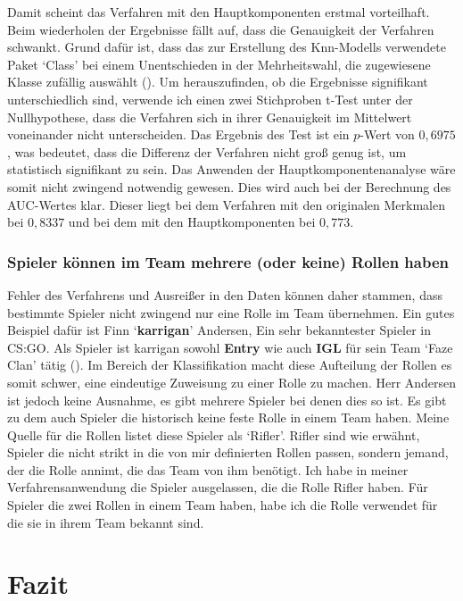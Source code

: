 \documentclass[envcountsame, envcountchap, deutsch]{i-studis}
\begin{document}
Damit scheint das Verfahren mit den Hauptkomponenten erstmal vorteilhaft.
Beim wiederholen der Ergebnisse fällt auf, dass die Genauigkeit der Verfahren schwankt. Grund dafür ist, dass das zur Erstellung des Knn-Modells verwendete Paket `Class' bei
einem Unentschieden in der Mehrheitswahl, die zugewiesene Klasse zufällig auswählt (\cite[p.4]{Ripley_2023}). Um herauszufinden, ob die Ergebnisse signifikant
unterschiedlich sind, verwende ich einen zwei Stichproben t-Test unter der Nullhypothese, dass die Verfahren sich in ihrer Genauigkeit im Mittelwert voneinander nicht unterscheiden. 
Das Ergebnis des Test ist ein $p$-Wert von $0,6975$, was bedeutet, dass die Differenz der Verfahren nicht groß genug ist, um
statistisch signifikant zu sein. Das Anwenden der Hauptkomponentenanalyse wäre somit nicht zwingend notwendig gewesen. 
Dies wird auch bei der Berechnung des AUC-Wertes klar. Dieser liegt bei dem Verfahren mit den originalen Merkmalen bei $0,8337$ und bei dem mit 
den Hauptkomponenten bei $0,773$.

\subsection{Spieler können im Team mehrere (oder keine) Rollen haben}
Fehler des Verfahrens und Ausreißer in den Daten können daher stammen, dass bestimmte Spieler nicht zwingend nur eine Rolle im Team übernehmen.
Ein gutes Beispiel dafür ist Finn `\textbf{karrigan}' Andersen, Ein sehr bekanntester Spieler in CS:GO.\@
Als Spieler ist karrigan sowohl \textbf{Entry} wie auch \textbf{IGL} für sein Team `Faze Clan' tätig (\cite{B_2023}). Im Bereich der Klassifikation macht diese Aufteilung der Rollen es somit schwer, eine eindeutige Zuweisung zu einer Rolle zu machen.
Herr Andersen ist jedoch keine Ausnahme, es gibt mehrere Spieler bei denen dies so ist. Es gibt zu dem auch Spieler die historisch keine feste Rolle in einem Team haben. Meine Quelle für die Rollen listet diese Spieler als `Rifler'.
Rifler sind wie erwähnt, Spieler die nicht strikt in die von mir definierten Rollen passen, sondern jemand, der die Rolle annimt, die das Team von ihm benötigt. Ich habe in meiner Verfahrensanwendung die Spieler ausgelassen, die die Rolle Rifler haben.
Für Spieler die zwei Rollen in einem Team haben, habe ich die Rolle verwendet für die sie in ihrem Team bekannt sind.


\chapter{Fazit}
\end{document}
